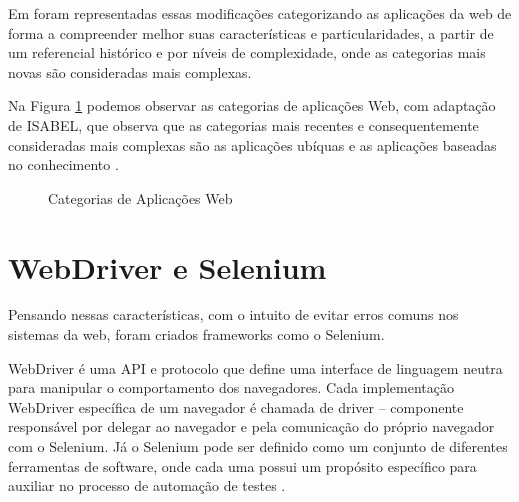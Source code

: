 \documentclass[
	12pt,				%
	openright,			%
	oneside,			%
	a4paper,			%
	chapter=TITLE,		%
	section=TITLE,		%
	subsection=TITLE,	%
	subsubsection=TITLE,%
	english,			%
	brazil				%
	]{abntex2}
\theoremstyle{definition}
\begin{document}
Em \cite{kappel2004web} foram representadas essas modificações categorizando as aplicações da web de forma a compreender melhor suas características e particularidades, a partir de um referencial histórico e por níveis de complexidade, onde as categorias mais novas são consideradas mais  complexas.

Na Figura \ref{Categorias de Aplicações Web} podemos observar as categorias de aplicações Web, com adaptação de ISABEL, que observa que as categorias mais recentes e consequentemente consideradas mais complexas são as aplicações ubíquas e as aplicações baseadas no conhecimento \cite{santa2011seleccao}.

\begin{figure}[!h]
\centering
\caption{Categorias de Aplicações Web}
\label{Categorias de Aplicações Web}
\end{figure}

\pagebreak

\section{WebDriver e Selenium}

Pensando nessas características, com o intuito de evitar erros comuns nos sistemas da web, foram criados frameworks como o Selenium.

WebDriver é uma API e protocolo que define uma interface de linguagem neutra para manipular o comportamento dos navegadores. Cada implementação WebDriver específica de um navegador é chamada de driver – componente responsável por delegar ao navegador e pela comunicação do próprio navegador com o Selenium. Já o Selenium pode ser definido como um conjunto de diferentes ferramentas de software, onde cada uma possui um propósito específico para auxiliar no processo de automação de testes \cite{seleniumdoc}.
\end{document}
